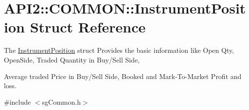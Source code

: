\hypertarget{struct_a_p_i2_1_1_c_o_m_m_o_n_1_1_instrument_position}{\section{A\-P\-I2\-:\-:C\-O\-M\-M\-O\-N\-:\-:Instrument\-Position Struct Reference}
\label{struct_a_p_i2_1_1_c_o_m_m_o_n_1_1_instrument_position}
}


The \hyperlink{struct_a_p_i2_1_1_c_o_m_m_o_n_1_1_instrument_position}{Instrument\-Position} struct Provides the basic information like Open Qty, Open\-Side, Traded Quantity in Buy/\-Sell Side, \par
 Average traded Price in Buy/\-Sell Side, Booked and Mark-\/\-To-\/\-Market Profit and loss.  




{\ttfamily \#include $<$sg\-Common.\-h$>$}

